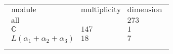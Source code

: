 \documentclass[crop,border=2mm]{standalone}
\begin{document}
\begin{tabular}{l}
$\displaystyle
\begin{array}{rll}
	\text{module}&\text{multiplicity}&\text{dimension} \\ \hline \text{all}&&273 \\
	\mathbb{C}&147&1\\
	L\left(\alpha_{1}+\alpha_{2}+\alpha_{3}\right)&18&7
\end{array}
$ \\ \\

\end{tabular}
\end{document}
